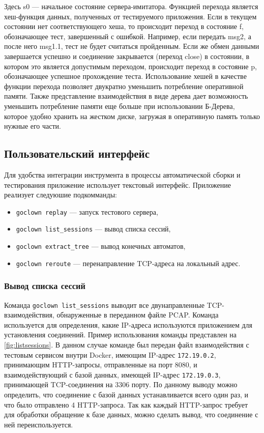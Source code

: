 Здесь s0 --- начальное состояние сервера-имитатора. Функцией перехода является
хеш-функция данных, полученных от тестируемого приложения. Если в текущем
состоянии нет соответствующего хеша, то происходит переход в состояние f,
обозначающее тест, завершенный с ошибкой. Например, если передать msg2, а после
него msg1.1, тест не будет считаться пройденным. Если же обмен данными
завершается успешно и соединение закрывается (переход close) в состоянии, в
котором это является допустимым переходом, происходит переход в состояние p,
обозначающее успешное прохождение теста.
Использование хешей в качестве функции перехода позволяет двукратно уменьшить
потребление оперативной памяти. Также представление взаимодействия в виде
дерева дает возможность уменьшить потребление памяти еще больше при
использовании Б-Дерева, которое удобно хранить на жестком диске, загружая
в оперативную память только нужные его части.

\subsection{Пользовательский интерфейс}
Для удобства интеграции инструмента в процессы автоматической сборки и
тестирования приложение использует текстовый интерфейс.
Приложение реализует следуюшие подкомманды:

\begin{itemize}
    \item \lstinline{goclown replay} --- запуск тестового сервера,  
    \item \lstinline{goclown list_sessions} --- вывод списка сессий,  
    \item \lstinline{goclown extract_tree} --- вывод конечных автоматов,  
    \item \lstinline{goclown reroute} --- перенаправление TCP-адреса на
        локальный адрес.  
\end{itemize}

\subsubsection{Вывод списка сессий}
Команда \lstinline{goclown list_sessions} выводит все двунаправленные
TCP-взаимодействия, обнаруженные в переданном файле PCAP. Команда используется
для определения, какие IP-адреса используются приложением для установления
соединений. Пример использования команды представлен на
\autoref{fig:listsessions}. В данном случае команде был передан файл
взаимодействия с тестовым сервисом внутри Docker, имеющим IP-адрес
\lstinline{172.19.0.2}, принимающим HTTP-запросы, отправленные на порт 8080, и
взаимодействующий с базой данных, имеющей IP-адрес \lstinline{172.19.0.3},
принимающей TCP-соединения на 3306 порту. По данному выводу можно определить,
что соединение с базой данных устанавливается всего один раз, и что было
отправлено 4 HTTP-запроса. Так как каждый HTTP-запрос требует для обработки
обращение к базе данных, можно сделать вывод, что соединение с ней
переиспользуется.

